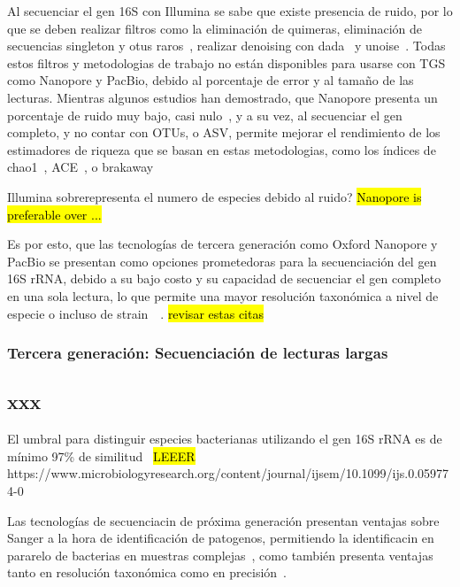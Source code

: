 Al secuenciar el gen 16S con Illumina se sabe que existe presencia de ruido, por lo que se deben realizar filtros como la eliminación de quimeras, eliminación de secuencias singleton y otus raros~\cite{caporaso2011global,auer2017analysis}, realizar denoising con dada~\cite{callahan2016dada2} y unoise~\cite{edgar2016unoise2}. Todas estos filtros y metodologias de trabajo no están disponibles para usarse con TGS como Nanopore y PacBio, debido al porcentaje de error y al tamaño de las lecturas.
Mientras algunos estudios han demostrado, que Nanopore presenta un porcentaje de ruido muy bajo, casi nulo~\cite{szoboszlay2023nanopore}, y a su vez, al secuenciar el gen completo, y no contar con OTUs, o ASV, permite mejorar el rendimiento de los estimadores de riqueza que se basan en estas metodologias, como los índices de chao1~\cite{chao1984nonparametric}, ACE~\cite{chao1992estimating}, o brakaway~\cite{willis2015estimating}


Illumina sobrerepresenta el numero de especies debido al ruido? \hl{Nanopore is preferable over ...}

Es por esto, que las tecnologías de tercera generación como Oxford Nanopore y PacBio se presentan como opciones prometedoras para la secuenciación del gen 16S rRNA, debido a su bajo costo y su capacidad de secuenciar el gen completo en una sola lectura, lo que permite una mayor resolución taxonómica a nivel de especie o incluso de strain~\cite{szoboszlay2023nanopore}~\cite{urban2021freshwater,delahaye2021sequencing}. \hl{revisar estas citas}

\subsubsection{Tercera generación: Secuenciación de lecturas largas}




\subsection{xxx}

El umbral para distinguir especies bacterianas utilizando el gen 16S rRNA es de mínimo 97\% de similitud~\cite{kim2014towards}
\hl{LEEER} https://www.microbiologyresearch.org/content/journal/ijsem/10.1099/ijs.0.059774-0


Las tecnologías de secuenciacin de próxima generación presentan ventajas sobre Sanger a la hora de identificación de patogenos, permitiendo la identificacin en pararelo de bacterias en muestras complejas~\cite{peker2019comparison}, como también presenta ventajas tanto en resolución taxonómica como en precisión~\cite{motro2017next}.

